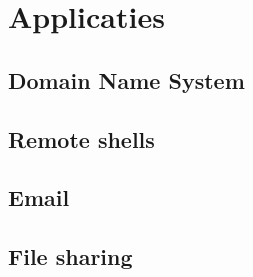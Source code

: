 \chapter{Applicaties}
\label{chap:applicaties}



\section{Domain Name System}
\label{sec:dns}


\section{Remote shells}



\section{Email}



\section{File sharing}
